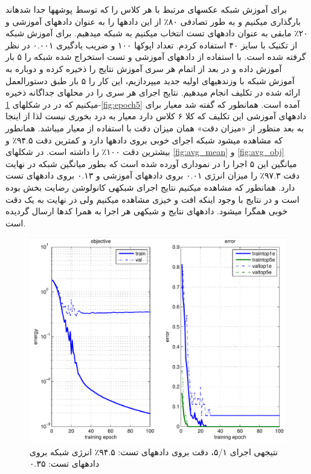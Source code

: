 \documentclass[10pt,a4paper]{article}
\newcommand{\نیمفاصله}{\halfspace}
\renewcommand{\ }{\halfspace}
\newcommand{\مق}{\lr}
\begin{document}
برای آموزش شبکه عکس\ های مرتبط با هر کلاس را که توسط پوشه\ ها جدا شده\ اند بارگذاری میکنیم و به طور تصادفی ۸۰٪ از این داده\ ها را به عنوان داده\ های آموزشی و ۲۰٪ مابقی به عنوان داده\ های تست انتخاب می\ کنیم به شبکه می\ دهیم. برای آموزش شبکه از تکنیک \مق{mini-batch} با سایز ۴۰ استفاده کردم. تعداد اپوک\ ها ۱۰۰ و ضریب یادگیری ۰.۰۰۱ در نظر گرفته شده است. با استفاده از داده\ های آموزشی و تست استخراج شده شبکه را ۵ بار آموزش داده و در بعد از اتمام هر سری آموزش نتایج را ذخیره کرده و دوباره به آموزش شبکه با وزن\ دهی\ های اولیه جدید می\ پردازیم، این کار را ۵ بار طبق دستورالعمل ارائه شده در تکلیف انجام می\ دهیم. نتایج اجرای هر سری را در محل\ های جداگانه ذخیره میکنیم که در در شکل\ های
\ref{fig:epoch1}-\ref{fig:epoch5}
آمده است. همانطور که گفته شد معیار \مق{Top-5} برای داده\ های آموزشی این تکلیف که کلا ۶ کلاس دارد معیار به درد بخوری نیست لذا از اینجا به بعد منظور از «میزان دقت» همان میزان دقت با استفاده از معیار \مق{Top-1} می\ باشد. همان\ طور که مشاهده می\ شود شبکه اجرای خوبی بروی داده\ ها دارد و کمترین دقت ۹۴.۵٪ و بیشترین دقت ۱۰۰٪ را داشته است. در شکل\ های
\ref{fig:avg_mean} و \ref{fig:avg_obj}
میانگین این ۵ اجرا را در نموداری آورده شده است که بطور میانگین شبکه در نهایت دقت ۹۷.۳٪ را میزان انرژی ۰.۰۱ بروی داده\ های آموزشی و ۰.۱۳ بروی داده\ های تست دارد.
همان\ طور که مشاهده می\ کنیم نتایج اجرای شبکه\ ی کانولوشن رضایت بخش بوده است و در نتایج با وجود اینکه افت و خیزی مشاهده می\ کنیم ولی در نهایت به یک دقت خوبی همگرا می\ شود. داده\ های نتایج و شبکه\ ی هر اجرا به همرا کدها ارسال گردیده است.
\begin{figure}
\centering
\includegraphics[width=.8\textwidth]{../sec_C/results/1.png}
\caption{نتیجه\ ی اجرای ۵/۱، دقت بروی داده\ های تست: ۹۴.۵٪ انرژی شبکه بروی داده\ های تست: ۰.۳۵}\label{fig:epoch1}
\end{figure}
\end{document}
